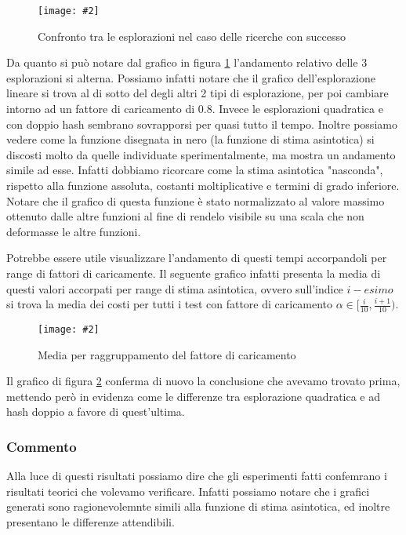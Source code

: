\documentclass{article}
\newcommand{\image}[3][1]{
	\centering
	\texttt{[image: \#2]}
	\caption{#3}
}
\begin{document}
\begin{figure}[H]
\image[0.75]{Successo_Confronto_Asintotico_scala_logaritmica}{Confronto tra le esplorazioni nel caso delle ricerche con successo}
\label{fig:Successo_Confronto_Asintotico_scala_logaritmica}
\end{figure} 
Da quanto si può notare dal grafico in figura \ref{fig:Successo_Confronto_Asintotico_scala_logaritmica} l'andamento relativo delle 3 esplorazioni si alterna. Possiamo infatti notare che il grafico dell'esplorazione lineare si trova al di sotto del degli altri 2 tipi di esplorazione, per poi cambiare intorno ad un fattore di caricamento di 0.8. Invece le esplorazioni quadratica e con doppio hash sembrano sovrapporsi per quasi tutto il tempo. Inoltre possiamo vedere come la funzione disegnata in nero (la funzione di stima asintotica) si discosti molto da quelle individuate sperimentalmente, ma mostra un andamento simile ad esse. Infatti dobbiamo ricorcare come la stima asintotica "nasconda", rispetto alla funzione assoluta, costanti moltiplicative e termini di grado inferiore. Notare che il grafico di questa funzione è stato normalizzato al valore massimo ottenuto dalle altre funzioni al fine di rendelo visibile su una scala che non deformasse le altre funzioni. 

Potrebbe essere utile visualizzare l'andamento di questi tempi accorpandoli per range di fattori di caricamente. Il seguente grafico infatti presenta la media di questi valori accorpati per range di stima asintotica, ovvero sull'indice $i-esimo$ si trova la media dei costi per tutti i test con fattore di caricamento $\alpha \in [\frac{i}{10}, \frac{i + 1}{10})$.

\begin{figure}[H]
\image[0.75]{Successo_Confronto_barre_scala_logaritmica}{Media per raggruppamento del fattore di caricamento}
\label{fig:Successo_Confronto_barre_scala_logaritmica}
\end{figure}

Il grafico di figura \ref{fig:Successo_Confronto_barre_scala_logaritmica} conferma di nuovo la conclusione che avevamo trovato prima, mettendo però in evidenza come le differenze tra esplorazione quadratica e ad hash doppio a favore di quest'ultima.

\subsubsection{Commento}
Alla luce di questi risultati possiamo dire che gli esperimenti fatti confemrano i risultati teorici che volevamo verificare. Infatti possiamo notare che i grafici generati sono ragionevolemnte simili alla funzione di stima asintotica, ed inoltre presentano le differenze attendibili.
\end{document}
